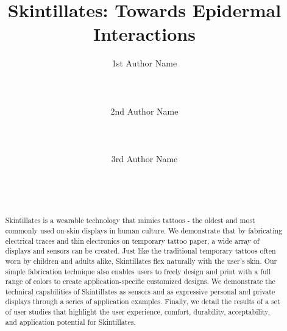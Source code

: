 \documentclass{sigchi}
\begin{document}
\title{Skintillates: Towards Epidermal Interactions}

\author{
  \alignauthor 1st Author Name\\
    \\
    \\
    \\
  \alignauthor 2nd Author Name\\
    \\
    \\
    \\
  \alignauthor 3rd Author Name\\
    \\
    \\
    \\
}

\maketitle

\begin{abstract}
Skintillates is a wearable technology that mimics tattoos - the oldest and most commonly used on-skin displays in human culture. We demonstrate that by fabricating electrical traces and thin electronics on temporary tattoo paper, a wide array of displays and sensors can be created. Just like the traditional temporary tattoos often worn by children and adults alike, Skintillates flex naturally with the user’s skin. Our simple fabrication technique also enables users to freely design and print with a full range of colors to create application-specific customized designs. We demonstrate the technical capabilities of Skintillates as sensors and as expressive personal and private displays through a series of application examples. Finally, we detail the results of a set of user studies that highlight the user experience, comfort, durability, acceptability, and application potential for Skintillates. 
\end{abstract}


\end{document}
